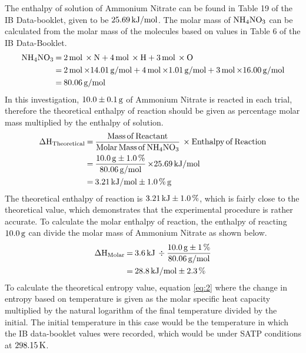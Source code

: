 \documentclass{article}
\begin{document}
\noindent
The enthalpy of solution of Ammonium Nitrate can be found in Table 19 of the IB Data-booklet, given to be $\ce{25.69 kJ/mol}$. The molar mass of $\ce{NH4NO3}$ can be calculated from the molar mass of the molecules based on values in Table 6 of the IB Data-Booklet.
\begin{equation}
    \begin{split}
        \ce{
        NH4NO3 &= 2 mol \times N + 4 mol \times H + 3mol \times O \\
        &= 2 mol \times} \ce{14.01 g/mol + 4mol \times} \ce{1.01 g/mol + 3mol \times} \ce{16.00 g/mol \\
        &= 80.06 g/mol
        }
    \end{split}
\end{equation}
In this investigation, $\ce{10.0 \pm 0.1 g}$ of Ammonium Nitrate is reacted in each trial, therefore the theoretical enthalpy of reaction should be given as percentage molar mass multiplied by the enthalpy of solution.
\begin{equation}
\begin{split}
  \ce{
  \Delta H_{Theoretical} &= \frac{Mass of Reactant}{Molar Mass of NH4NO3} \times Enthalpy of Reaction \\
  &= \frac{10.0 g \pm 1.0\%}{80.06 g/mol} \times} \ce{25.69 kJ/mol \\
  &= 3.21 kJ/mol \pm} \ce{1.0\% g
  }  
\end{split}
\end{equation}
The theoretical enthalpy of reaction is $\ce{3.21 kJ \pm 1.0\%}$, which is fairly close to the theoretical value, which demonstrates that the experimental procedure is rather accurate. To calculate the molar enthalpy of reaction, the enthalpy of reacting $\ce{10.0g}$ can divide the molar mass of Ammonium Nitrate as shown below.
\begin{equation}
    \begin{split}
        \ce{
        \Delta H_{Molar} &= 3.6 kJ \div \frac{10.0 g \pm 1\%}{80.06 g/mol} \\ 
        &= 28.8 kJ/mol \pm 2.3\%
        }
    \end{split}
\end{equation}
\noindent
To calculate the theoretical entropy value, equation \ref{eq:2} where the change in entropy based on temperature is given as the molar specific heat capacity multiplied by the natural logarithm of the final temperature divided by the initial. The initial temperature in this case would be the temperature in which the IB data-booklet values were recorded, which would be under SATP conditions at $\ce{298.15K}$.
\end{document}
